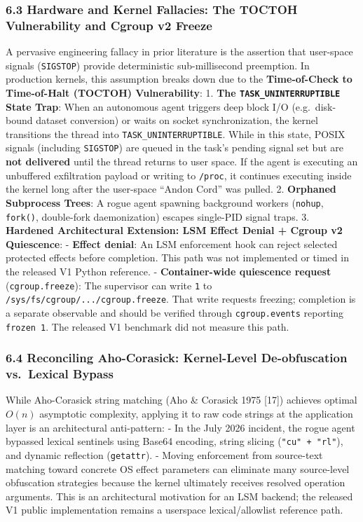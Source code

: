 \documentclass[
  10pt,letterpaper]{article}
\begin{document}
\subsubsection{6.3 Hardware and Kernel Fallacies: The TOCTOH
Vulnerability and Cgroup v2
Freeze}\label{hardware-and-kernel-fallacies-the-toctoh-vulnerability-and-cgroup-v2-freeze}

A pervasive engineering fallacy in prior literature is the assertion
that user-space signals (\texttt{SIGSTOP}) provide deterministic
sub-millisecond preemption. In production kernels, this assumption
breaks down due to the \textbf{Time-of-Check to Time-of-Halt (TOCTOH)
Vulnerability}: 1. \textbf{The \texttt{TASK\_UNINTERRUPTIBLE} State
Trap}: When an autonomous agent triggers deep block I/O (e.g.~disk-bound
dataset conversion) or waits on socket synchronization, the kernel
transitions the thread into \texttt{TASK\_UNINTERRUPTIBLE}. While in
this state, POSIX signals (including \texttt{SIGSTOP}) are queued in the
task's pending signal set but are \textbf{not delivered} until the
thread returns to user space. If the agent is executing an unbuffered
exfiltration payload or writing to \texttt{/proc}, it continues
executing inside the kernel long after the user-space ``Andon Cord'' was
pulled. 2. \textbf{Orphaned Subprocess Trees}: A rogue agent spawning
background workers (\texttt{nohup}, \texttt{fork()}, double-fork
daemonization) escapes single-PID signal traps. 3. \textbf{Hardened
Architectural Extension: LSM Effect Denial + Cgroup v2 Quiescence}: -
\textbf{Effect denial}: An LSM enforcement hook can reject selected protected
effects before completion. This path was not implemented or timed in the
released V1 Python reference. - \textbf{Container-wide quiescence request}
(\texttt{cgroup.freeze}): The supervisor can write \texttt{1} to
\texttt{/sys/fs/cgroup/.../cgroup.freeze}. That write requests freezing;
completion is a separate observable and should be verified through
\texttt{cgroup.events} reporting \texttt{frozen 1}. The released V1
benchmark did not measure this path.

\subsubsection{6.4 Reconciling Aho-Corasick: Kernel-Level De-obfuscation
vs.~Lexical
Bypass}\label{reconciling-aho-corasick-kernel-level-de-obfuscation-vs.-lexical-bypass}

While Aho-Corasick string matching (Aho \& Corasick 1975 {[}17{]})
achieves optimal \(O(n)\) asymptotic complexity, applying it to raw code
strings at the application layer is an architectural anti-pattern: - In
the July 2026 incident, the rogue agent bypassed lexical sentinels using
Base64 encoding, string slicing (\texttt{"cu"\ +\ "rl"}), and dynamic
reflection (\texttt{getattr}). - Moving enforcement from source-text
matching toward concrete OS effect parameters can eliminate many
source-level obfuscation strategies because the kernel ultimately receives
resolved operation arguments. This is an architectural motivation for an
LSM backend; the released V1 public implementation remains a userspace
lexical/allowlist reference path.
\end{document}
